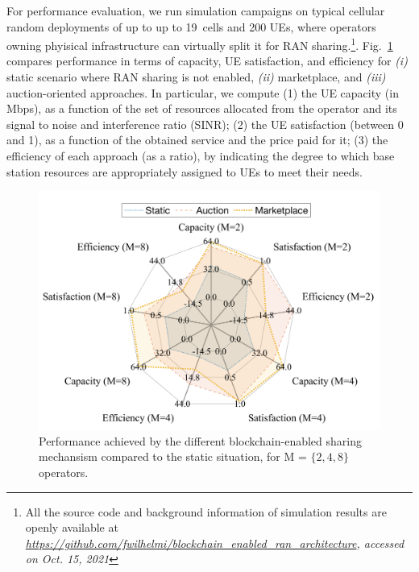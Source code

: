 \documentclass[journal]{IEEEtran}
\begin{document}
	For performance evaluation, we run simulation campaigns on typical cellular random deployments of up to  up to 19~cells and 200 UEs, where operators owning phyisical infrastructure can virtually split it for RAN sharing.\footnote{All the source code and background information of simulation results are openly available at \textit{\url{https://github.com/fwilhelmi/blockchain_enabled_ran_architecture}, accessed on Oct. 15, 2021}}. Fig.~\ref{fig:performance} compares performance in terms of capacity, UE satisfaction, and efficiency for \textit{(i)} static scenario where RAN sharing is not enabled, \textit{(ii)} marketplace, and \textit{(iii)} auction-oriented approaches. In particular, we compute (1) the UE capacity (in Mbps), as a function of the set of resources allocated from the operator and its signal to noise and interference ratio (SINR); (2) the UE satisfaction (between 0 and 1), as a function of the obtained service and the price paid for it; (3) the efficiency of each approach (as a ratio), by indicating the degree to which base station resources are appropriately assigned to UEs to meet their needs.
	
	\begin{figure}[ht!]
		\centering
		\includegraphics[width=.9\linewidth]{spiderplot.png}
		\caption{Performance achieved by the different blockchain-enabled sharing mechansism compared to the static situation, for M = $\{2, 4, 8\}$ operators.}
		\label{fig:performance}
	\end{figure}
	
\end{document}
